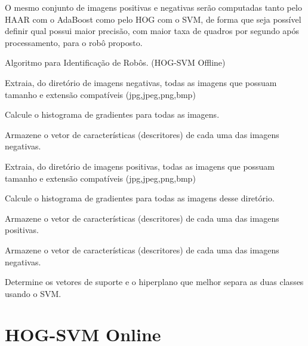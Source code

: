 O mesmo conjunto de imagens positivas e negativas serão computadas tanto pelo HAAR com o AdaBoost como pelo HOG com o SVM, de forma que seja possível definir qual possui maior precisão, com maior taxa de quadros por segundo após processamento, para o robô proposto.
\begin{algorithm}
{
\caption{Algoritmo para Identificação de Robôs. (HOG-SVM Offline)}\label{lst:algROF}


Extraia, do diretório de imagens negativas, todas as imagens que possuam tamanho e extensão compatíveis (jpg,jpeg,png,bmp)

Calcule o histograma de gradientes para todas as imagens.

Armazene o vetor de características (descritores) de cada uma das imagens negativas.

Extraia, do diretório de imagens positivas, todas as imagens que possuam tamanho e extensão compatíveis (jpg,jpeg,png,bmp)

Calcule o histograma de gradientes para todas as imagens desse diretório.

Armazene o vetor de características (descritores) de cada uma das imagens positivas.

Armazene o vetor de características (descritores) de cada uma das imagens negativas.


Determine os vetores de suporte e o hiperplano que melhor separa as duas classes usando o SVM.

}




\end{algorithm}

\pagebreak

\section{HOG-SVM Online}

